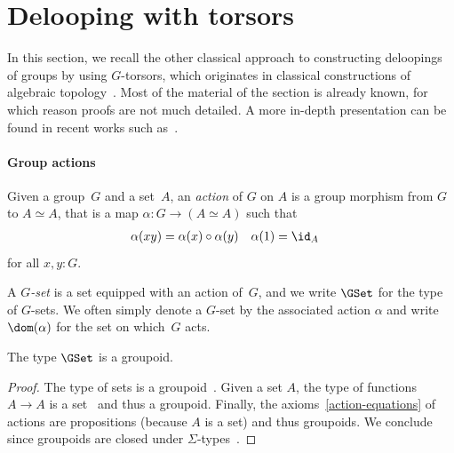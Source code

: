 \section{Delooping with torsors}
\label{torsor-delooping}
In this section, we recall the other classical approach to constructing
deloopings of groups by using $G$-torsors, which originates in classical
constructions of algebraic topology~\cite{demazure1970groupes}. Most of the
material of the section is already known, for which reason proofs are not much
detailed. A more in-depth presentation can be found in recent works such
as~\cite{symmetry,buchholtz2023central}.

\paragraph{Group actions}
Given a group~$G$ and a set~$A$, an \emph{action} of $G$ on $A$ is a group
morphism from $G$ to $A \simeq A$, that is a map $\alpha : G\to (A \simeq A)$
such that
\begin{align}
  \label{action-equations}
  \alpha(xy)&= \alpha(x) \circ \alpha(y)
  &
  \alpha(1) &= \id_A
\end{align}
for all $x,y:G$.

A \emph{$G$-set} is a set equipped with an action of~$G$, and we write $\GSet$
for the type of $G$-sets. We often simply denote a $G$-set by the associated
action $\alpha$ and write $\dom(\alpha)$ for the set on which~$G$ acts.

\begin{lemma}
  \label{gset-groupoid}
  The type $\GSet$ is a groupoid.
\end{lemma}
\begin{proof}
  The type of sets is a groupoid~\cite[Theorem 7.1.11]{hottbook}. Given a set
  $A$, the type of functions $A\to A$ is a set~\cite[Theorem 7.1.9]{hottbook}
  and thus a groupoid. Finally,
  the axioms~\cref{action-equations} of actions are propositions (because $A$
  is a set) and thus groupoids. We conclude since groupoids are closed under
  $\Sigma$-types~\cite[Theorem 7.1.8]{hottbook}.
\end{proof}

